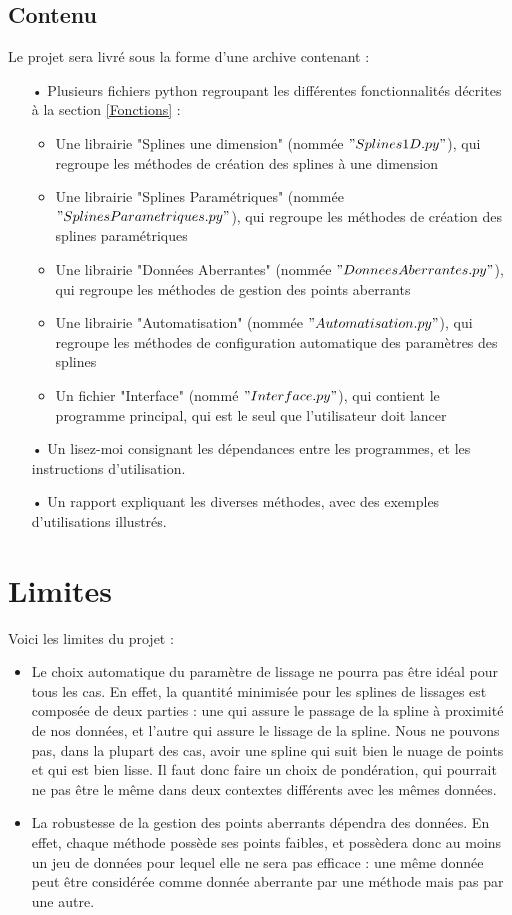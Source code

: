 \documentclass[a4paper,12pt]{article}
\begin{document}
\subsection*{Contenu}
Le projet sera livré sous la forme d'une archive contenant :
\begin{itemize}
\item[•] Plusieurs fichiers python regroupant les différentes fonctionnalités décrites à la section \ref{Fonctions}  : 
\begin{itemize}
\item Une librairie "Splines une dimension" (nommée $"Splines1D.py"$), qui regroupe les méthodes de création des splines à une dimension
\item Une librairie "Splines Paramétriques" (nommée $"SplinesParametriques.py"$), qui regroupe les méthodes de création des splines paramétriques
\item Une librairie "Données Aberrantes" (nommée $"DonneesAberrantes.py"$), qui regroupe les méthodes de gestion des points aberrants
\item Une librairie "Automatisation" (nommée $"Automatisation.py"$), qui regroupe les méthodes de configuration automatique des paramètres des splines
\item Un fichier "Interface" (nommé $"Interface.py"$), qui contient le programme principal, qui est le seul que l'utilisateur doit lancer
\end{itemize}
\item[•] Un lisez-moi consignant les dépendances entre les programmes, et les instructions d'utilisation.
\item[•] Un rapport expliquant les diverses méthodes, avec des exemples d’utilisations illustrés.
\end{itemize}

\newpage
\section{Limites}

Voici les limites du projet :
\begin{itemize}
\item Le choix automatique du paramètre de lissage ne pourra pas être idéal pour tous les cas. En effet, la quantité minimisée pour les splines de lissages est composée de deux parties : une qui assure le passage de la spline à proximité de nos données, et l’autre qui assure le lissage de la spline. Nous ne pouvons pas, dans la plupart des cas, avoir une spline qui suit bien le nuage de points et qui est bien lisse. Il faut donc faire un choix de pondération, qui pourrait ne pas être le même dans deux contextes différents avec les mêmes données.
\item La robustesse de la gestion des points aberrants dépendra des données. En effet, chaque méthode possède ses points faibles, et possèdera donc au moins un jeu de données pour lequel elle ne sera pas efficace : une même donnée peut être considérée comme donnée aberrante par une méthode mais pas par une autre. 
\end{itemize}
\end{document}
